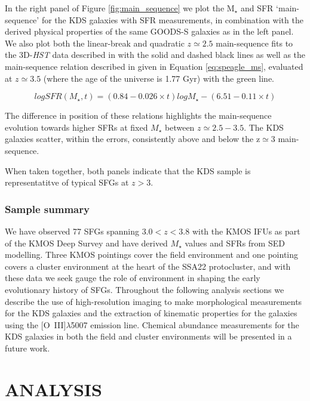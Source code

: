 \documentclass[fleqn,usenatbib]{mn2e}
\begin{document}
In the right panel of Figure \ref{fig:main_sequence} we plot the M$_{\star}$ and SFR `main-sequence' for the KDS galaxies with SFR measurements, in combination with the derived physical properties of the same GOODS-S galaxies as in the left panel.
We also plot both the linear-break and quadratic $z\simeq2.5$ main-sequence fits to the 3D-{\em HST} data described in \cite{Whitaker2014} with the solid and dashed black lines as well as the main-sequence relation described in \cite{Speagle2014} given in Equation \ref{eq:speagle_ms}, evaluated at $z\simeq3.5$ (where the age of the universe is 1.77 Gyr) with the green line.

\begin{equation}\label{eq:speagle_ms}
logSFR(M_{\star}, t) = (0.84 - 0.026 \times t)logM_{\star} - (6.51 - 0.11 \times t)
\end{equation}

The difference in position of these relations highlights the main-sequence evolution towards higher SFRs at fixed $M_{\star}$ between $z\simeq2.5-3.5$.
The KDS galaxies scatter, within the errors, consistently above and below the z$\simeq3$ main-sequence.

When taken together, both panels indicate that the KDS sample is representatitve of typical SFGs at $z>3$.

\subsubsection{Sample summary}\label{subsubsec:sample_summary}
We have observed 77 SFGs spanning $3.0 < z < 3.8$ with the KMOS IFUs as part of the KMOS Deep Survey and have derived $M_{\star}$ values and SFRs from SED modelling.
Three KMOS pointings cover the field environment and one pointing covers a cluster environment at the heart of the SSA22 protocluster, and with these data we seek gauge the role of environment in shaping the early evolutionary history of SFGs.
Throughout the following analysis sections we describe the use of high-resolution imaging to make morphological measurements for the KDS galaxies and the extraction of kinematic properties for the galaxies using the [O~{\sc III}]$\lambda$5007 emission line.
Chemical abundance measurements for the KDS galaxies in both the field and cluster environments will be presented in a future work.

\section{ANALYSIS}\label{sec:analysis}
\end{document}
